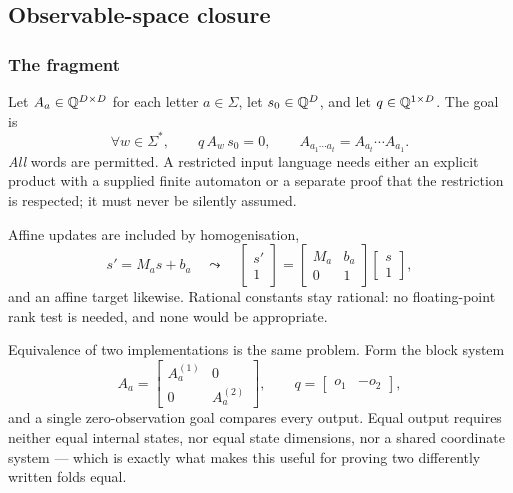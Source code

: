 \subsection{Observable-space closure}
\label{sec:obs-closure}

\subsubsection*{The fragment}

Let $A_a\in\mathbb{Q}^{D\times D}$ for each letter $a\in\Sigma$, let $s_0\in\mathbb{Q}^{D}$, and
let $q\in\mathbb{Q}^{1\times D}$. The goal is
\begin{equation}\label{eq:linear-goal}
 \forall w\in\Sigma^{*},\qquad q\,A_w\,s_0=0,
 \qquad A_{a_1\cdots a_t}=A_{a_t}\cdots A_{a_1}.
\end{equation}
\emph{All} words are permitted. A restricted input language needs either an
explicit product with a supplied finite automaton or a separate proof that the
restriction is respected; it must never be silently assumed.

Affine updates are included by homogenisation,
\[
 s'=M_as+b_a
 \quad\leadsto\quad
 \begin{bmatrix}s'\\1\end{bmatrix}
 =\begin{bmatrix}M_a&b_a\\0&1\end{bmatrix}\begin{bmatrix}s\\1\end{bmatrix},
\]
and an affine target likewise. Rational constants stay rational: no
floating-point rank test is needed, and none would be appropriate.

Equivalence of two implementations is the same problem. Form the block system
\[
 A_a=\begin{bmatrix}A^{(1)}_a&0\\0&A^{(2)}_a\end{bmatrix},\qquad
 q=\begin{bmatrix}o_1&-o_2\end{bmatrix},
\]
and a single zero-observation goal compares every output. Equal output requires
neither equal internal states, nor equal state dimensions, nor a shared
coordinate system --- which is exactly what makes this useful for proving two
differently written folds equal.

